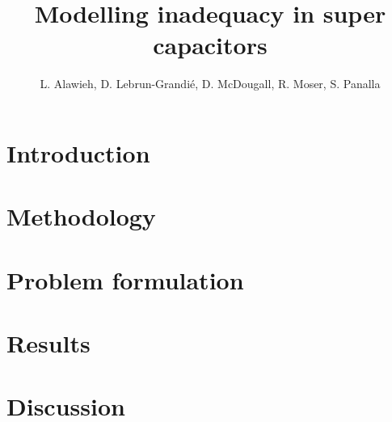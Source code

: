 \documentclass[11pt]{article}
\title{Modelling inadequacy in super capacitors}
\author{L. Alawieh, D. Lebrun-Grandi\'e, D. McDougall, R. Moser, S. Panalla}
\begin{document}
\maketitle

\section{Introduction}

\section{Methodology}

\section{Problem formulation}






\section{Results}

\section{Discussion}
\end{document}

